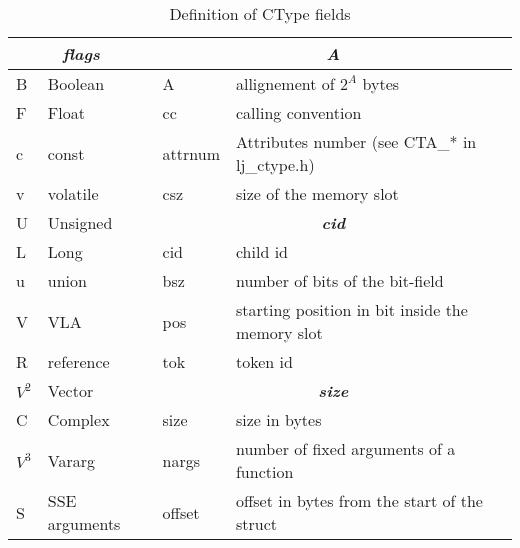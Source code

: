 \begin{table}[p]
\footnotesize
\centering
\caption{Definition of CType fields}
\label{tab:ffi-ctype2}
\begin{tabular}{ll|l|l|}
\hline
\multicolumn{2}{|c|}{\textit{\textbf{flags}}} & \multicolumn{2}{c|}{\textit{\textbf{A}}}                                    \\ \hline
\multicolumn{1}{|l|}{B}      & Boolean        & A                      & allignement of $2^A$ bytes                         \\
\multicolumn{1}{|l|}{F}      & Float          & cc                     & calling convention                                 \\
\multicolumn{1}{|l|}{c}      & const          & attrnum                & Attributes number (see CTA\_* in lj\_ctype.h)      \\
\multicolumn{1}{|l|}{v}      & volatile       & csz                    & size of the memory slot                            \\ \cline{3-4}
\multicolumn{1}{|l|}{U}      & Unsigned       & \multicolumn{2}{c|}{\textit{\textbf{cid}}}                                  \\ \cline{3-4}
\multicolumn{1}{|l|}{L}      & Long           & cid                    & child id                                           \\
\multicolumn{1}{|l|}{u}      & union          & bsz                    & number of bits of the bit-field                    \\
\multicolumn{1}{|l|}{V}      & VLA            & pos                    & starting position in bit inside the memory slot    \\
\multicolumn{1}{|l|}{R}      & reference      & tok                    & token id                                           \\ \cline{3-4}
\multicolumn{1}{|l|}{$V^2$}  & Vector         & \multicolumn{2}{c|}{\textit{\textbf{size}}}                                 \\ \cline{3-4}
\multicolumn{1}{|l|}{C}      & Complex        & size                   & size in bytes                                      \\
\multicolumn{1}{|l|}{$V^3$}  & Vararg         & nargs                  & number of fixed arguments of a function            \\
\multicolumn{1}{|l|}{S}      & SSE arguments  & offset                 & offset in bytes from the start of the struct       \\ \cline{1-2}

\end{tabular}
\end{table}
